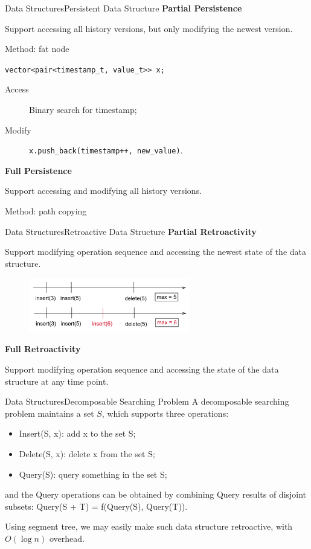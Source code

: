 \documentclass{beamer}
\begin{document}
\begin{frame}{Data Structures}{Persistent Data Structure}
\textbf{Partial Persistence}

Support accessing all history versions, but only modifying the newest version.

\pause

Method: fat node

\lstinline|vector<pair<timestamp_t, value_t>> x;|

\begin{description}
	\item[Access] Binary search for timestamp;
	\item[Modify] \lstinline|x.push_back(timestamp++, new_value)|.
\end{description}

\pause

\textbf{Full Persistence}

Support accessing and modifying all history versions.

Method: path copying
\end{frame}

\begin{frame}{Data Structures}{Retroactive Data Structure}
\textbf{Partial Retroactivity}

Support modifying operation sequence and accessing the newest state of the data structure.

\begin{figure}
	\centering
	\includegraphics[width=7cm]{timeline.png}
\end{figure}

\textbf{Full Retroactivity}

Support modifying operation sequence and accessing the state of the data structure at any time point.

\end{frame}

\begin{frame}{Data Structures}{Decomposable Searching Problem}
A decomposable searching problem maintains a set $S$, which supports three operations:
\begin{itemize}
	\item Insert(S, x): add x to the set S;
	\item Delete(S, x): delete x from the set S;
	\item Query(S): query something in the set S;
\end{itemize}
and the Query operations can be obtained by combining Query results of disjoint subsets: Query(S + T) = f(Query(S), Query(T)).

\pause 

Using segment tree, we may easily make such data structure retroactive, with $O(\log n)$ overhead.

\end{frame}
\end{document}
